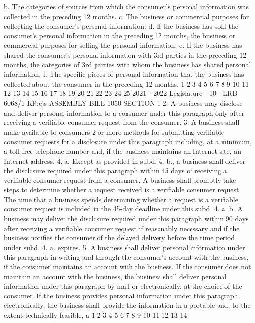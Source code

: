 b. The categories of sources from which the consumer's personal information
was collected in the preceding 12 months.
c. The business or commercial purposes for collecting the consumer's personal
information.
d. If the business has sold the consumer's personal information in the preceding
12 months, the business or commercial purposes for selling the personal information.
e. If the business has shared the consumer's personal information with 3rd
parties in the preceding 12 months, the categories of 3rd parties with whom the
business has shared personal information.
f. The specific pieces of personal information that the business has collected
about the consumer in the preceding 12 months.
1
2
3
4
5
6
7
8
9
10
11
12
13
14
15
16
17
18
19
20
21
22
23
24
25
2021 - 2022 Legislature - 10 - LRB-6068/1
KP:cjs
 ASSEMBLY BILL 1050 SECTION 1
2. A business may disclose and deliver personal information to a consumer
under this paragraph only after receiving a verifiable consumer request from the
consumer.
3. A business shall make available to consumers 2 or more methods for
submitting verifiable consumer requests for a disclosure under this paragraph
including, at a minimum, a toll-free telephone number and, if the business
maintains an Internet site, an Internet address.
4. a. Except as provided in subd. 4. b., a business shall deliver the disclosure
required under this paragraph within 45 days of receiving a verifiable consumer
request from a consumer. A business shall promptly take steps to determine whether
a request received is a verifiable consumer request. The time that a business spends
determining whether a request is a verifiable consumer request is included in the
45-day deadline under this subd. 4. a.
b. A business may deliver the disclosure required under this paragraph within
90 days after receiving a verifiable consumer request if reasonably necessary and if
the business notifies the consumer of the delayed delivery before the time period
under subd. 4. a. expires.
5. A business shall deliver personal information under this paragraph in
writing and through the consumer's account with the business, if the consumer
maintains an account with the business. If the consumer does not maintain an
account with the business, the business shall deliver personal information under this
paragraph by mail or electronically, at the choice of the consumer. If the business
provides personal information under this paragraph electronically, the business
shall provide the information in a portable and, to the extent technically feasible, a
1
2
3
4
5
6
7
8
9
10
11
12
13
14
